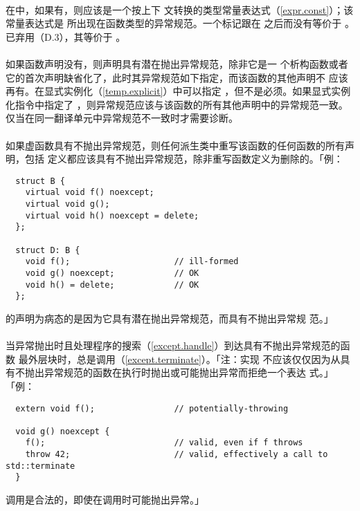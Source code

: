 \paragraph{}
在中，如果有，则应该是一个按上下
文转换的类型常量表达式（\ref{expr.const}）；该常量表达式是
所出现在函数类型的异常规范。一个\tm{(}标记跟在
之后而没有等价于
。 已弃用（D.3），其等价于
 。

\paragraph{}
如果函数声明没有，则声明具有潜在抛出异常规范，除非它是一
个析构函数或者它的首次声明缺省化了，此时其异常规范如下指定，而该函数的其他声明不
应该再有。在显式实例化（\ref{temp.explicit}）中可以指定
，但不是必须。如果显式实例化指令中指定了
，则异常规范应该与该函数的所有其他声明中的异常规范一致。
仅当在同一翻译单元中异常规范不一致时才需要诊断。

\paragraph{}
如果虚函数具有不抛出异常规范，则任何派生类中重写该函数的任何函数的所有声明，包括
定义都应该具有不抛出异常规范，除非重写函数定义为删除的。「例：
\begin{lstlisting}
  struct B {
    virtual void f() noexcept;
    virtual void g();
    virtual void h() noexcept = delete;
  };

  struct D: B {
    void f();                     // ill-formed
    void g() noexcept;            // OK
    void h() = delete;            // OK
  };
\end{lstlisting}
的声明为病态的是因为它具有潜在抛出异常规范，而具有不抛出异常规
范。」

\paragraph{}
当异常抛出时且处理程序的搜索（\ref{except.handle}）到达具有不抛出异常规范的函数
最外层块时，总是调用（\ref{except.terminate}）。「注：实现
不应该仅仅因为从具有不抛出异常规范的函数在执行时抛出或可能抛出异常而拒绝一个表达
式。」「例：
\begin{lstlisting}
  extern void f();                // potentially-throwing

  void g() noexcept {
    f();                          // valid, even if f throws
    throw 42;                     // valid, effectively a call to std::terminate
  }
\end{lstlisting}
调用是合法的，即使在调用时可能抛出异常。」

